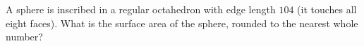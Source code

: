 A sphere is inscribed in a regular octahedron with edge length $104$ (it touches all eight faces). What is the surface area of the sphere, rounded to the nearest whole number?

